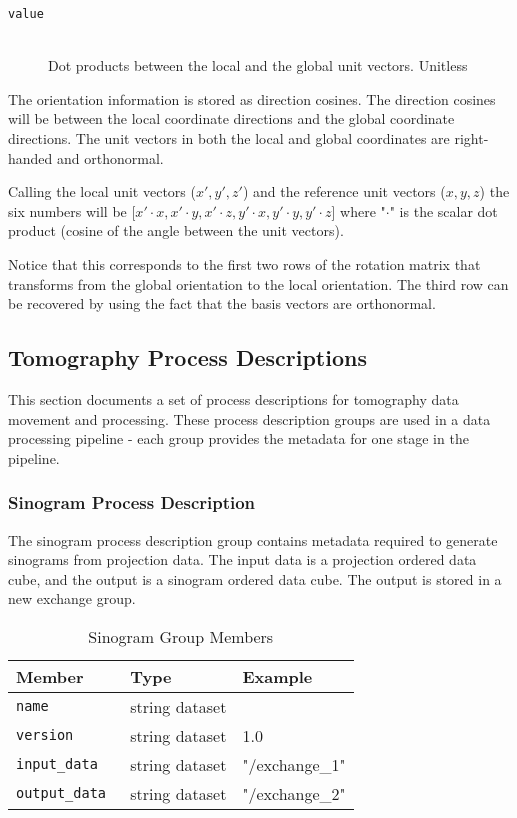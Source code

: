\begin{description}
\item[\tt {value}] \hfill \\
{Dot products between the local and the global unit vectors. Unitless}
\end{description}

The orientation information is stored as direction cosines. The direction 
cosines will be between the local coordinate directions and the global 
coordinate directions. The unit vectors in both the local and global 
coordinates are right-handed and orthonormal. 

Calling the local unit vectors ($x',y',z'$) and the reference unit vectors 
($x,y,z$) the six numbers will be [$x' \cdot x, x' \cdot y, x' \cdot z, y' 
\cdot x, y'  \cdot y, y' \cdot z$] where "$\cdot$" is the scalar dot product 
(cosine of the angle between the unit vectors). 

Notice that this corresponds to the first two rows of the rotation matrix 
that transforms from the global orientation to the local orientation. The 
third row can be recovered by using the fact that the basis vectors are 
orthonormal.

\subsection{Tomography Process Descriptions}
This section documents a set of process descriptions for tomography data movement and processing. These process description groups are used in a data processing pipeline - each group provides the metadata for one stage in the pipeline.

\subsubsection{Sinogram Process Description}
\label{table:sinogram}

The sinogram process description group contains metadata required to generate sinograms from projection data. The input data is a projection ordered data cube, and the output is a sinogram ordered data cube. The output is stored in a new exchange group.

\begin{table}[h!]\sffamily \footnotesize
\caption{Sinogram Group Members}
\centering
{}
\begin{tabular}{l l l}

\toprule
\bfseries Member     & \bfseries Type & \bfseries Example \\
\midrule
\tt{name} & string dataset &  \\  
\tt{version}  & string dataset  & 1.0 \\
\tt{input\_data} &  string dataset & "/exchange\_1" \\
\tt{output\_data} & string dataset & "/exchange\_2" \\
\bottomrule
\end{tabular}
\end{table}

